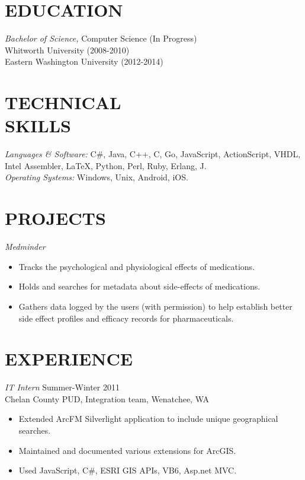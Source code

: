 \documentclass[line,margin]{res}
\begin{document}
\address{905 Elm St., LA Hall, Room 142, Cheney, WA, 99004}
\address{509-699-1184}
\address{ericfode@gmail.com}

 
\begin{resume}
 
 
\section{EDUCATION} {\sl Bachelor of Science,} Computer Science (In Progress)\\
					Whitworth University (2008-2010) \\
					Eastern Washington University (2012-2014)
 
 
\section{TECHNICAL \\ SKILLS} {\sl Languages \& Software:} C\#, Java, C++, C, Go,  JavaScript, ActionScript, VHDL, Intel Assembler, \LaTeX, Python, Perl, Ruby, Erlang, J.\\
                {\sl Operating Systems:} Windows, Unix, Android, iOS.
                
\section{PROJECTS} {\sl Medminder}
                 \begin{itemize}  \itemsep -2pt %
                	\item Tracks the psychological and physiological effects of medications.
                	\item Holds and searches for metadata about side-effects of medications.
                	\item Gathers data logged by the users (with permission) to help establish better side effect profiles and efficacy records for pharmaceuticals.
                \end{itemize}
\section{EXPERIENCE} 
 				{\sl IT Intern} \hfill Summer-Winter 2011\\
				Chelan County PUD, Integration team, Wenatchee, WA
                 \begin{itemize}  \itemsep -2pt %
					 \item Extended	ArcFM Silverlight application to include unique geographical searches.
					 \item Maintained and documented various extensions for ArcGIS.
					 \item Used JavaScript, C\#, ESRI GIS APIs, VB6, Asp.net MVC.
				 \end{itemize}
				 

\end{resume}
\end{document}
